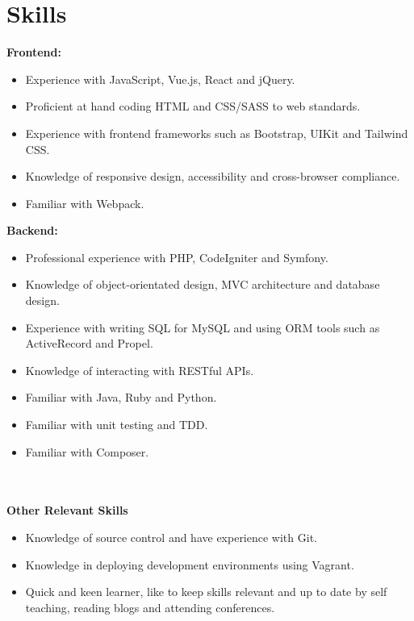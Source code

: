 \documentclass[11pt,a4paper,sans]{moderncv}
\begin{document}
\makecvtitle

\section{Skills}
\begin{minipage}[t]{0.45\textwidth}
	\textbf{Frontend:}
	\begin{itemize}
		\item Experience with JavaScript, Vue.js, React and jQuery.
		\item Proficient at hand coding HTML and CSS/SASS to web standards.
		\item Experience with frontend frameworks such as Bootstrap, UIKit and Tailwind CSS.
		\item Knowledge of responsive design, accessibility and cross-browser compliance.
		\item Familiar with Webpack.
	\end{itemize}
\end{minipage}
\begin{minipage}[t]{0.45\textwidth}
	\textbf{Backend:}
	\begin{itemize}
		\item Professional experience with PHP, CodeIgniter and Symfony. 
		\item Knowledge of object-orientated design, MVC architecture and database design.
		\item Experience with writing SQL for MySQL and using ORM tools such as ActiveRecord and Propel.
		\item Knowledge of interacting with RESTful APIs.
		\item Familiar with Java, Ruby and Python.
		\item Familiar with unit testing and TDD.
		\item Familiar with Composer.
	\end{itemize}
\end{minipage}
\\\\
\textbf{Other Relevant Skills}
\begin{itemize}
	\item Knowledge of source control and have experience with Git.
	\item Knowledge in deploying development environments using Vagrant.
	\item Quick and keen learner, like to keep skills relevant and up to date by self teaching, reading blogs and attending conferences.  
\end{itemize}
\end{document}

